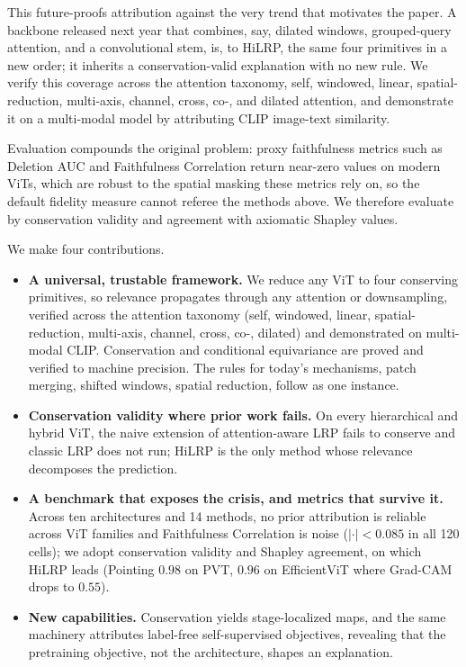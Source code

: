 \documentclass[lettersize,journal]{IEEEtran}
\begin{document}
This future-proofs attribution against the very trend that motivates the paper. A backbone released next year that combines, say, dilated windows, grouped-query attention, and a convolutional stem, is, to HiLRP, the same four primitives in a new order; it inherits a conservation-valid explanation with no new rule. We verify this coverage across the attention taxonomy, self, windowed, linear, spatial-reduction, multi-axis, channel, cross, co-, and dilated attention, and demonstrate it on a multi-modal model by attributing CLIP image-text similarity.

Evaluation compounds the original problem: proxy faithfulness metrics such as Deletion AUC and Faithfulness Correlation return near-zero values on modern ViTs, which are robust to the spatial masking these metrics rely on, so the default fidelity measure cannot referee the methods above. We therefore evaluate by conservation validity and agreement with axiomatic Shapley values.

We make four contributions.
\begin{itemize}[leftmargin=1.2em]
  \item \textbf{A universal, trustable framework.} We reduce any ViT to four conserving primitives, so relevance propagates through any attention or downsampling, verified across the attention taxonomy (self, windowed, linear, spatial-reduction, multi-axis, channel, cross, co-, dilated) and demonstrated on multi-modal CLIP. Conservation and conditional equivariance are proved and verified to machine precision. The rules for today's mechanisms, patch merging, shifted windows, spatial reduction, follow as one instance.
  \item \textbf{Conservation validity where prior work fails.} On every hierarchical and hybrid ViT, the naive extension of attention-aware LRP fails to conserve and classic LRP does not run; HiLRP is the only method whose relevance decomposes the prediction.
  \item \textbf{A benchmark that exposes the crisis, and metrics that survive it.} Across ten architectures and 14 methods, no prior attribution is reliable across ViT families and Faithfulness Correlation is noise ($|{\cdot}|<0.085$ in all 120 cells); we adopt conservation validity and Shapley agreement, on which HiLRP leads (Pointing $0.98$ on PVT, $0.96$ on EfficientViT where Grad-CAM drops to $0.55$).
  \item \textbf{New capabilities.} Conservation yields stage-localized maps, and the same machinery attributes label-free self-supervised objectives, revealing that the pretraining objective, not the architecture, shapes an explanation.
\end{itemize}
\end{document}

